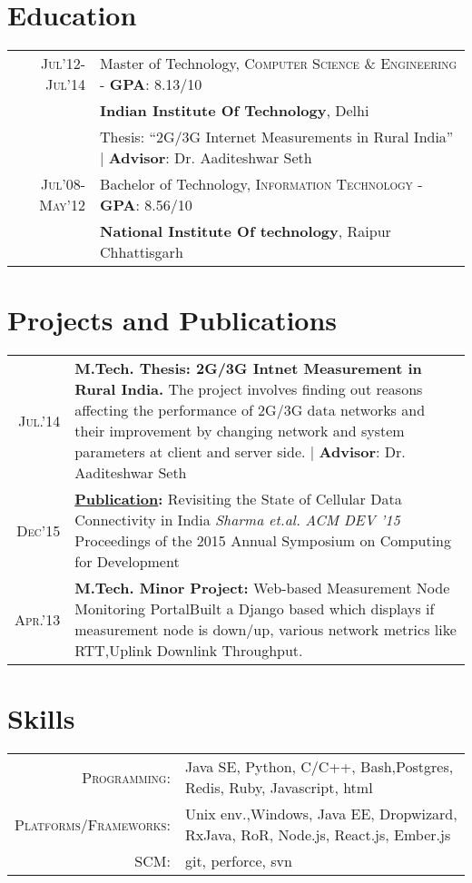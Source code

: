 \documentclass[a4paper,10pt]{article}
\begin{document}
\section{Education}
\begin{tabular}{rp{15cm}}	
\textsc{Jul'12-Jul'14} & Master of Technology, \textsc{Computer Science \& Engineering} -  \textbf{GPA}: 8.13/10\\
&\normalsize \textbf{Indian Institute Of Technology}, Delhi\\
& Thesis: ``2G/3G Internet Measurements in Rural India'' | \small \textbf{ Advisor}: Dr. Aaditeshwar Seth\\
\textsc{Jul'08-May'12} & Bachelor of Technology, \textsc{Information Technology} - \textbf{GPA}: 8.56/10\\
&\normalsize \textbf{National Institute Of technology}, Raipur Chhattisgarh\\
\end{tabular}

\section{Projects and Publications}
\begin{tabular}{rp{15cm}}
 \textsc{Jul.'14} & \textbf{M.Tech. Thesis: 2G/3G Intnet Measurement in Rural India.}
 \normalsize The project involves finding out reasons affecting
the performance of 2G/3G data networks and their improvement by changing
network and system parameters at client and server side.  | \small \textbf{ Advisor}: Dr. Aaditeshwar Seth\\
\textsc{Dec'15} & \textbf{\href{http://dl.acm.org/citation.cfm?id=2830649}{Publication}:} Revisiting the State of Cellular Data Connectivity in India \emph{Sharma et.al.} \emph{ACM DEV '15} Proceedings of the 2015 Annual Symposium on Computing for Development\\
\textsc{Apr.'13} & \textbf{M.Tech. Minor Project:} Web-based Measurement Node Monitoring Portal\normalsize Built a Django based which displays if measurement node is down/up, various network metrics like RTT,Uplink Downlink Throughput.
\end{tabular}

\section{Skills}
\begin{tabular}{rp{15cm}}
\textsc{Programming:} & Java SE, Python, C/C++, Bash,Postgres, Redis, Ruby, Javascript, html\\
\textsc{Platforms/Frameworks:} & Unix env.,Windows, Java EE, Dropwizard, RxJava, RoR, Node.js, React.js, Ember.js\\
\textsc{SCM:} & git, perforce, svn\\
\end{tabular}
\end{document}

